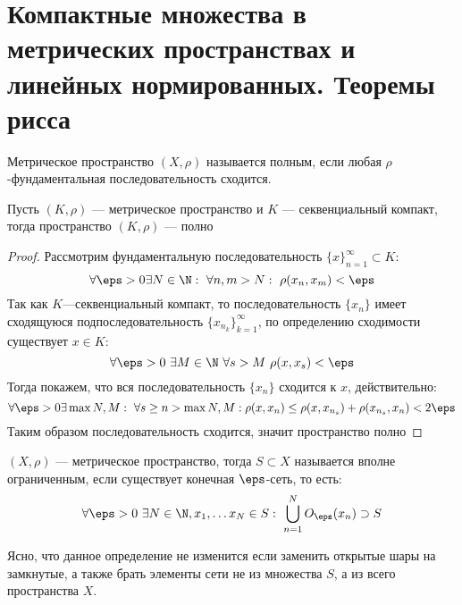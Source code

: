 \newpage
\section{Компактные множества в метрических пространствах и линейных нормированных. Теоремы рисса}
\begin{definition}
	Метрическое пространство $(X, \rho)$ называется полным, если любая $\rho$-фундаментальная последовательность сходится.
\end{definition}

\begin{claim}
	Пусть $(K, \rho)$ --- метрическое пространство и $K$ --- секвенциальный компакт, тогда пространство $(K, \rho)$ --- полно
\end{claim}
\begin{proof}
	Рассмотрим фундаментальную последовательность $\{x\}_{n = 1}^\infty \subset K$:
	$$
	\forall \eps> 0 \exists N \in \N: \ \forall n,m > N: \ \rho(x_n,x_m) < \eps
	$$
	Так как $K$---секвенциальный компакт, то последовательность $\{x_n\}$ имеет сходящуюся подпоследовательность $\{x_{n_k}\}_{k=1}^\infty$, по определению сходимости существует $x \in K$:
	$$
	\forall \eps > 0 \ \exists M \in \N \ \forall s > M \ \rho(x, x_s) < \eps
	$$
	Тогда покажем, что вся последовательность $\{x_n\}$ сходится к $x$, действительно:
	$$
	\forall \eps > 0 \exists \max{N,M}: \ \forall s \geq n > \max{N,M}: \rho(x, x_n) \leq \rho(x, x_{n_s}) + \rho(x_{n_s}, x_n) < 2\eps
	$$
	Таким образом последовательность сходится, значит пространство полно
\end{proof}

\begin{definition}
	$(X, \rho)$ --- метрическое пространство, тогда $S \subset X$ называется вполне ограниченным, если существует конечная $\eps$-сеть, то есть:
	$$
	\forall \eps > 0 \ \exists N \in \N, x_1, \dots x_N \in S: \ \bigcup_{n=1}^N O_\eps(x_n) \supset S
	$$
\end{definition}
\begin{remark}
	Ясно, что данное определение не изменится если заменить открытые шары на замкнутые, а также брать элементы сети не из множества $S$, а из всего пространства $X$. 
\end{remark}

